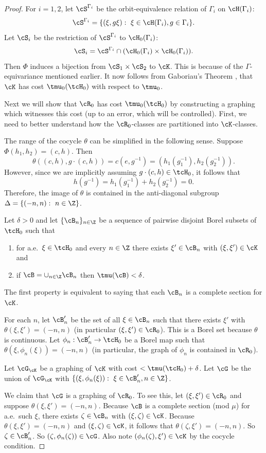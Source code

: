 \documentclass[12pt]{article}
\theoremstyle{plain}
\theoremstyle{definition}
\theoremstyle{remark}
\newcommand{\G}{\Gamma}
\begin{document}
\begin{proof}
For $i=1,2$, let $\cS^{\G_i}$ be the orbit-equivalence relation of $\G_i$ on $\cH(\G_i)$:
$$\cS^{\G_i}=\{(\xi, g\xi):~\xi \in \cH(\G_i), g\in \G_i\}.$$
Let $\cS_i$ be the restriction of $\cS^{\G_i}$ to $\cH_0(\G_i)$:
$$\cS_i=\cS^{\G_i}\cap (\cH_0(\G_i)\times \cH_0(\G_i)).$$
Then $\Phi$ induces a bijection from $\cS_1\times \cS_2$ to $\cK$. This is because of the $\G$-equivariance mentioned earlier. It now follows from Gaboriau's Theorem \cite[Theorem 24.9]{MR2095154}, that $\cK$ has cost $\tmu_0(\tcH_0)$ with respect to $\tmu_0$. 

Next we will show that $\cR_0$ has cost $\tmu_0(\tcH_0)$ by constructing a graphing which witnesses this cost (up to an error, which will be controlled). First, we need to better understand how the $\cR_0$-classes are partitioned into $\cK$-classes.

The range of the cocycle $\theta$ can be simplified in the following sense. Suppose $\Phi(h_1,h_2)=(c,h)$. Then
$$\theta((c,h),g\cdot (c,h))=c(e,g^{-1})=(h_1(g_1^{-1}), h_2(g_2^{-1})).$$
However, since we are implicitly assuming $g\cdot (c,h) \in \tcH_0$, it follows that 
$$h(g^{-1})=h_1(g_1^{-1})+h_2(g_2^{-1})=0.$$
Therefore, the image of $\theta$ is contained in the anti-diagonal subgroup $\Delta=\{(-n,n):~n \in \Z\}$. 


Let $\delta>0$ and let $\{\cB_n\}_{n\in \Z}$ be a sequence of pairwise disjoint Borel subsets of $\tcH_0$ such that 
\begin{enumerate}
    \item for a.e.\ $\xi \in \tcH_0$ and every $n\in \Z$ there exists $\xi'\in \cB_n$ with $(\xi,\xi')\in \cK$ and 
    \item if $\cB=\cup_{n\in \Z} \cB_n$ then $\tmu(\cB)<\delta$.
\end{enumerate}
The first property is equivalent to saying that each $\cB_n$ is a complete section for $\cK$. 

For each $n$, let $\cB'_n$ be the set of all $\xi\in \cB_n$ such that there exists $\xi'$ with $\theta(\xi,\xi')=(-n,n)$ (in particular $(\xi,\xi')\in \cR_0$). This is a Borel set because $\theta$ is continuous. Let $\phi_n:\cB'_n \to \tcH_0$ be a Borel map such that $\theta(\xi,\phi_n(\xi))=(-n,n)$ (in particular, the graph of $\phi_n$ is contained in $\cR_0$). 


Let $\cG_\cK$ be a graphing of $\cK$ with cost $<\tmu(\tcH_0)+\delta$. Let $\cG$ be the union of $\cG_\cK$ with $\{(\xi, \phi_n(\xi)):~\xi \in \cB'_n, n\in\Z\}$. 

We claim that $\cG$ is a graphing of $\cR_0$. To see this, let $(\xi,\xi')\in \cR_0$ and suppose $\theta(\xi,\xi')=(-n,n)$. Because $\cB$ is a complete section (mod $\mu$) for a.e.\ such $\xi$, there exists $\zeta \in \cB_n$ with $(\xi,\zeta)\in \cK$. Because $\theta(\xi,\xi')=(-n,n)$ and $(\xi,\zeta)\in \cK$, it follows that $\theta(\zeta,\xi')=(-n,n)$. So $\zeta \in \cB'_n$. So $(\zeta,\phi_n(\zeta))\in \cG$. Also note $(\phi_n(\zeta), \xi')\in \cK$ by the cocycle condition.


\end{proof}
\end{document}
